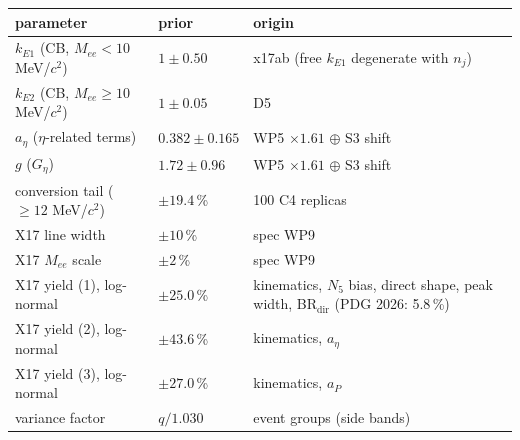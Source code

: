 \begin{tabular}{l l l}
\toprule
parameter & prior & origin \\
\midrule
$k_{E1}$ (CB, $M_{ee}<10$ MeV/$c^2$) & $1\pm0.50$ & x17ab (free $k_{E1}$ degenerate with $n_j$) \\
$k_{E2}$ (CB, $M_{ee}\ge10$ MeV/$c^2$) & $1\pm0.05$ & D5 \\
$a_\eta$ ($\eta$-related terms) & $0.382\pm0.165$ & WP5 $\times1.61$ $\oplus$ S3 shift \\
$g$ ($G_\eta$) & $1.72\pm0.96$ & WP5 $\times1.61$ $\oplus$ S3 shift \\
conversion tail ($\ge12$ MeV/$c^2$) & $\pm19.4$\,\% & 100 C4 replicas \\
X17 line width & $\pm10$\,\% & spec WP9 \\
X17 $M_{ee}$ scale & $\pm2$\,\% & spec WP9 \\
X17 yield (1), log-normal & $\pm25.0$\,\% & kinematics, $N_5$ bias, direct shape, peak width, BR$_\mathrm{dir}$ (PDG 2026: 5.8\,\%) \\
X17 yield (2), log-normal & $\pm43.6$\,\% & kinematics, $a_\eta$ \\
X17 yield (3), log-normal & $\pm27.0$\,\% & kinematics, $a_P$ \\
variance factor & $q/1.030$ & event groups (side bands) \\
\bottomrule
\end{tabular}
